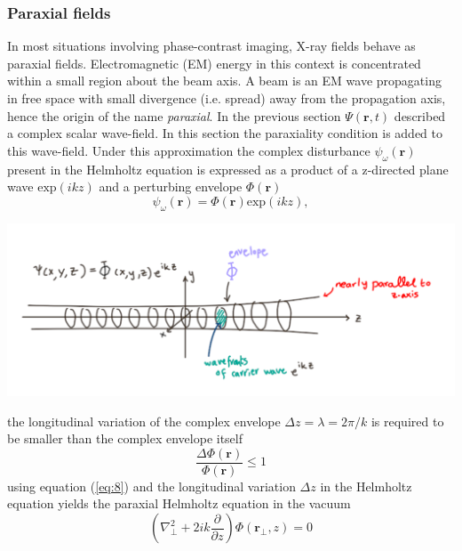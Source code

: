 \documentclass[10pt, a4paper, singlespacing]{report}
\newenvironment{Figure}
    {\par\medskip\noindent\minipage{\linewidth}}
    {\endminipage\par\medskip}
\begin{document}
\subsubsection{Paraxial fields}\label{Paraxial}
In most situations involving phase-contrast imaging, X-ray fields behave as paraxial fields. Electromagnetic (EM) energy in this context is concentrated within a small region about the beam axis. A beam is an EM wave propagating in free space with small divergence (i.e. spread) away from the propagation axis, hence the origin of the name \textit{paraxial}.
In the previous section $\Psi(\mathbf{r},t)$ described a complex scalar wave-field. In this section the paraxiality condition is added to this wave-field.
Under this approximation the complex disturbance $\psi_{\omega}(\mathbf{r})$ present in the Helmholtz equation is expressed as a product of a z-directed plane wave $\mathrm{exp}(ikz)$ and a perturbing envelope $\Phi(\mathbf{r})$\cite{PagsTutes}\cite{CH49}
\begin{equation}\label{eq:7}
\psi_{\omega}(\mathbf{r}) = \Phi(\mathbf{r})\mathrm{exp}(ikz),
\end{equation}
\begin{Figure}
\centering
\includegraphics[width=0.6\linewidth]{paraxial_beam.pdf}\label{fig:1}
\end{Figure}
the longitudinal variation of the complex envelope $\Delta z = \lambda = 2 \pi/k$ is required to be smaller than the complex envelope itself
\begin{equation}\label{eq:8}
\frac{\Delta \Phi(\mathbf{r})}{\Phi(\mathbf{r})} \leq 1
\end{equation}
using equation (\ref{eq:8}) and the longitudinal variation $\Delta z$  in the Helmholtz equation yields the paraxial Helmholtz equation in the vacuum
\begin{equation}\label{eq:9}
\left (\nabla_{\perp}^{2} + 2 i k \frac{\partial }{\partial z}\right ) \Phi(\mathbf{r}_{\perp}, z) = 0
\end{equation}
\end{document}
